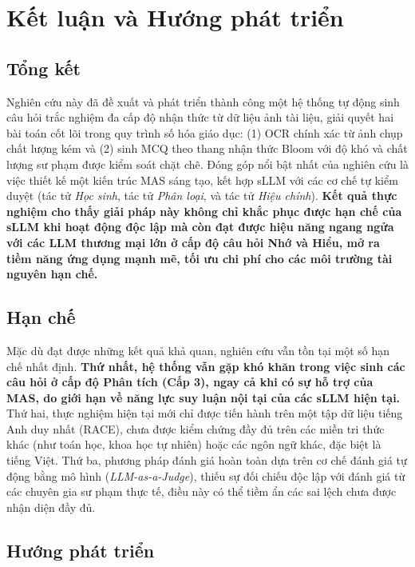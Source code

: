 \chapter{Kết luận và Hướng phát triển}
\label{chap:ket-luan}

\section{Tổng kết}

Nghiên cứu này đã đề xuất và phát triển thành công một hệ thống tự động sinh câu hỏi trắc nghiệm đa cấp độ nhận thức từ dữ liệu ảnh tài liệu, giải quyết hai bài toán cốt lõi trong quy trình số hóa giáo dục: (1) OCR chính xác từ ảnh chụp chất lượng kém và (2) sinh MCQ theo thang nhận thức Bloom với độ khó và chất lượng sư phạm được kiểm soát chặt chẽ. Đóng góp nổi bật nhất của nghiên cứu là việc thiết kế một kiến trúc MAS sáng tạo, kết hợp sLLM với các cơ chế tự kiểm duyệt (tác tử \textit{Học sinh}, tác tử \textit{Phân loại}, và tác tử \textit{Hiệu chỉnh}). \textbf{Kết quả thực nghiệm cho thấy giải pháp này không chỉ khắc phục được hạn chế của sLLM khi hoạt động độc lập mà còn đạt được hiệu năng ngang ngửa với các LLM thương mại lớn ở cấp độ câu hỏi Nhớ và Hiểu, mở ra tiềm năng ứng dụng mạnh mẽ, tối ưu chi phí cho các môi trường tài nguyên hạn chế.}

\section{Hạn chế}

Mặc dù đạt được những kết quả khả quan, nghiên cứu vẫn tồn tại một số hạn chế nhất định. \textbf{Thứ nhất, hệ thống vẫn gặp khó khăn trong việc sinh các câu hỏi ở cấp độ Phân tích (Cấp 3), ngay cả khi có sự hỗ trợ của MAS, do giới hạn về năng lực suy luận nội tại của các sLLM hiện tại.} Thứ hai, thực nghiệm hiện tại mới chỉ được tiến hành trên một tập dữ liệu tiếng Anh duy nhất (RACE), chưa được kiểm chứng đầy đủ trên các miền tri thức khác (như toán học, khoa học tự nhiên) hoặc các ngôn ngữ khác, đặc biệt là tiếng Việt. Thứ ba, phương pháp đánh giá hoàn toàn dựa trên cơ chế đánh giá tự động bằng mô hình (\textit{LLM-as-a-Judge}), thiếu sự đối chiếu độc lập với đánh giá từ các chuyên gia sư phạm thực tế, điều này có thể tiềm ẩn các sai lệch chưa được nhận diện đầy đủ.

\section{Hướng phát triển}

